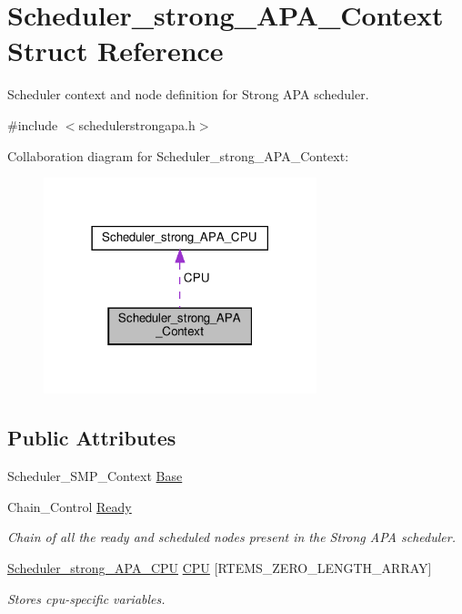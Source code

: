 \hypertarget{structScheduler__strong__APA__Context}{}\section{Scheduler\+\_\+strong\+\_\+\+A\+P\+A\+\_\+\+Context Struct Reference}
\label{structScheduler__strong__APA__Context}


Scheduler context and node definition for Strong A\+PA scheduler.  




{\ttfamily \#include $<$schedulerstrongapa.\+h$>$}



Collaboration diagram for Scheduler\+\_\+strong\+\_\+\+A\+P\+A\+\_\+\+Context\+:\nopagebreak
\begin{figure}[H]
\begin{center}
\leavevmode
\includegraphics[width=225pt]{structScheduler__strong__APA__Context__coll__graph}
\end{center}
\end{figure}
\subsection*{Public Attributes}
\begin{DoxyCompactItemize}
\item 
Scheduler\+\_\+\+S\+M\+P\+\_\+\+Context \hyperlink{structScheduler__strong__APA__Context_a55755b445b7e7beaf1b87b178521e615}{Base}
\item 
Chain\+\_\+\+Control \hyperlink{structScheduler__strong__APA__Context_a0c445c35a07b8aa14f9d76c6dfb4916c}{Ready}
\begin{DoxyCompactList}\small\item\em Chain of all the ready and scheduled nodes present in the Strong A\+PA scheduler. \end{DoxyCompactList}\item 
\hyperlink{structScheduler__strong__APA__CPU}{Scheduler\+\_\+strong\+\_\+\+A\+P\+A\+\_\+\+C\+PU} \hyperlink{structScheduler__strong__APA__Context_afdc7dcc1fef07a07130a8ddde0895e9c}{C\+PU} \mbox{[}R\+T\+E\+M\+S\+\_\+\+Z\+E\+R\+O\+\_\+\+L\+E\+N\+G\+T\+H\+\_\+\+A\+R\+R\+AY\mbox{]}
\begin{DoxyCompactList}\small\item\em Stores cpu-\/specific variables. \end{DoxyCompactList}\end{DoxyCompactItemize}


